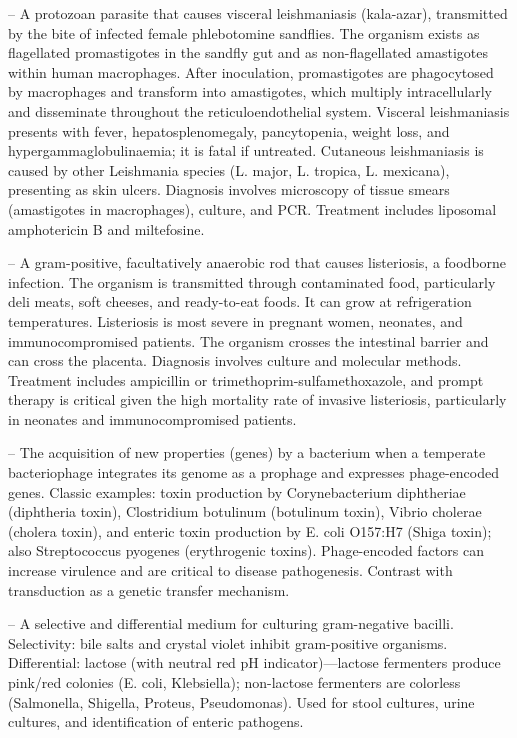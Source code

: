 -- A protozoan parasite that causes visceral leishmaniasis (kala-azar), transmitted by the bite of infected female phlebotomine sandflies. The organism exists as flagellated promastigotes in the sandfly gut and as non-flagellated amastigotes within human macrophages. After inoculation, promastigotes are phagocytosed by macrophages and transform into amastigotes, which multiply intracellularly and disseminate throughout the reticuloendothelial system. Visceral leishmaniasis presents with fever, hepatosplenomegaly, pancytopenia, weight loss, and hypergammaglobulinaemia; it is fatal if untreated. Cutaneous leishmaniasis is caused by other Leishmania species (L. major, L. tropica, L. mexicana), presenting as skin ulcers. Diagnosis involves microscopy of tissue smears (amastigotes in macrophages), culture, and PCR. Treatment includes liposomal amphotericin B and miltefosine.

-- A gram-positive, facultatively anaerobic rod that causes listeriosis, a foodborne infection. The organism is transmitted through contaminated food, particularly deli meats, soft cheeses, and ready-to-eat foods. It can grow at refrigeration temperatures. Listeriosis is most severe in pregnant women, neonates, and immunocompromised patients. The organism crosses the intestinal barrier and can cross the placenta. Diagnosis involves culture and molecular methods. Treatment includes ampicillin or trimethoprim-sulfamethoxazole, and prompt therapy is critical given the high mortality rate of invasive listeriosis, particularly in neonates and immunocompromised patients.

-- The acquisition of new properties (genes) by a bacterium when a temperate bacteriophage integrates its genome as a prophage and expresses phage-encoded genes. Classic examples: toxin production by Corynebacterium diphtheriae (diphtheria toxin), Clostridium botulinum (botulinum toxin), Vibrio cholerae (cholera toxin), and enteric toxin production by E. coli O157:H7 (Shiga toxin); also Streptococcus pyogenes (erythrogenic toxins). Phage-encoded factors can increase virulence and are critical to disease pathogenesis. Contrast with transduction as a genetic transfer mechanism.

-- A selective and differential medium for culturing gram-negative bacilli. Selectivity: bile salts and crystal violet inhibit gram-positive organisms. Differential: lactose (with neutral red pH indicator)—lactose fermenters produce pink/red colonies (E. coli, Klebsiella); non-lactose fermenters are colorless (Salmonella, Shigella, Proteus, Pseudomonas). Used for stool cultures, urine cultures, and identification of enteric pathogens.


